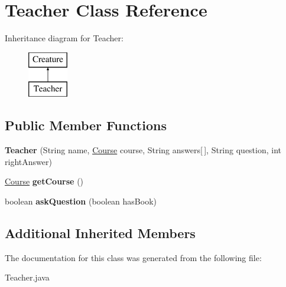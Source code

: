 \hypertarget{class_teacher}{}\section{Teacher Class Reference}
\label{class_teacher}
Inheritance diagram for Teacher\+:\begin{figure}[H]
\begin{center}
\leavevmode
\includegraphics[height=2.000000cm]{class_teacher}
\end{center}
\end{figure}
\subsection*{Public Member Functions}
\begin{DoxyCompactItemize}
\item 
\hypertarget{class_teacher_afe19b71773265eb94a4affa2540b4c6e}{}{\bfseries Teacher} (String name, \hyperlink{class_course}{Course} course, String answers\mbox{[}$\,$\mbox{]}, String question, int right\+Answer)\label{class_teacher_afe19b71773265eb94a4affa2540b4c6e}

\item 
\hypertarget{class_teacher_a009cd73ce30da1e37ce73fcf809b667a}{}\hyperlink{class_course}{Course} {\bfseries get\+Course} ()\label{class_teacher_a009cd73ce30da1e37ce73fcf809b667a}

\item 
\hypertarget{class_teacher_a5de26864d6efad58855d6b387cbcb3d7}{}boolean {\bfseries ask\+Question} (boolean has\+Book)\label{class_teacher_a5de26864d6efad58855d6b387cbcb3d7}

\end{DoxyCompactItemize}
\subsection*{Additional Inherited Members}


The documentation for this class was generated from the following file\+:\begin{DoxyCompactItemize}
\item 
Teacher.\+java\end{DoxyCompactItemize}
